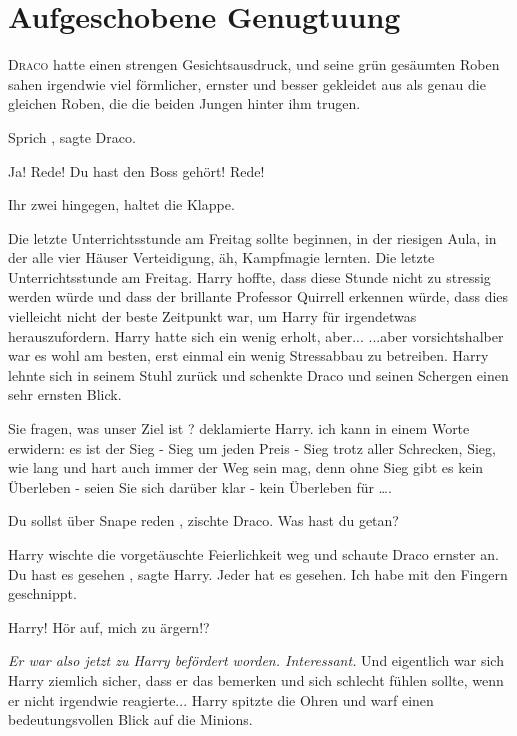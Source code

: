 \chapter{Aufgeschobene Genugtuung}

\lettrine{D}{raco} hatte einen strengen Gesichtsausdruck, und seine grün
gesäumten Roben sahen irgendwie viel förmlicher, ernster und besser gekleidet
aus als genau die gleichen Roben, die die beiden Jungen hinter ihm trugen.

\glqq Sprich\grqq{} , sagte Draco.

\glqq Ja! Rede!\grqq{} \glqq Du hast den Boss gehört! Rede!\grqq{}

\glqq Ihr zwei hingegen, haltet die Klappe.\grqq{}

Die letzte Unterrichtsstunde am Freitag sollte beginnen, in der riesigen Aula,
in der alle vier Häuser Verteidigung, äh, Kampfmagie lernten. Die letzte
Unterrichtsstunde am Freitag. Harry hoffte, dass diese Stunde nicht zu stressig
werden würde und dass der brillante Professor Quirrell erkennen würde, dass dies
vielleicht nicht der beste Zeitpunkt war, um Harry für irgendetwas
herauszufordern. Harry hatte sich ein wenig erholt, aber... ...aber
vorsichtshalber war es wohl am besten, erst einmal ein wenig Stressabbau zu
betreiben. Harry lehnte sich in seinem Stuhl zurück und schenkte Draco und
seinen Schergen einen sehr ernsten Blick.

\glqq Sie fragen, was unser Ziel ist ?\grqq{} deklamierte Harry. \glqq ich kann
in einem Worte erwidern: es ist der Sieg - Sieg um jeden Preis - Sieg trotz
aller Schrecken, Sieg, wie lang und hart auch immer der Weg sein mag, denn ohne
Sieg gibt es kein Überleben - seien Sie sich darüber klar - kein Überleben für
….\grqq{}

\glqq Du sollst über Snape reden\grqq{} , zischte Draco. \glqq Was hast du
getan?\grqq{}

Harry wischte die vorgetäuschte Feierlichkeit weg und schaute Draco ernster an.
\glqq Du hast es gesehen\grqq{} , sagte Harry. \glqq Jeder hat es gesehen. Ich
habe mit den Fingern geschnippt.\grqq{}

\glqq Harry! Hör auf, mich zu ärgern!?\grqq{}

\emph{ Er war also jetzt zu Harry befördert worden. Interessant. } Und
eigentlich war sich Harry ziemlich sicher, dass er das bemerken und sich
schlecht fühlen sollte, wenn er nicht irgendwie reagierte... Harry spitzte die
Ohren und warf einen bedeutungsvollen Blick auf die Minions.

